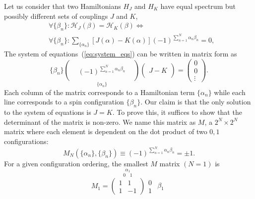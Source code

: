 \documentclass[a4paper]{article}
\newcommand{\Ha}[0]{\mathcal{H}}
\begin{document}
Let us consider that two Hamiltonians $H_J$ and $H_K$ have equal spectrum but possibly different sets of couplings $J$ and $K$,
\begin{align}
	&\forall \{\beta_n\}: \Ha_J(\beta) = \Ha_K(\beta) \Leftrightarrow \\
	&\forall \{\beta_n\}: \sum_{\{\alpha_n\}} [J(\alpha) - K(\alpha)] (-1)^{\sum_{n=1}^{N} \alpha_n \beta_n} = 0,
	\label{eq:system_eqs}
\end{align}
The system of equations~(\ref{eq:system_eqs}) can be written in matrix form as
\begin{equation}
	\{\beta_n\}\left.
	\underset{\{\alpha_n\}}{
		\left(\begin{matrix}
			& & \\
			& (-1)^{\sum_{n=1}^{N} \alpha_n \beta_n} & \\
			& &
		\end{matrix}\right)
		}
		\right.
		\left(\begin{matrix}
		\\
		J - K \\
		\left.\right.
	\end{matrix}\right)
	=
	\left(\begin{matrix}
		0\\
		0\\
		\vdots
	\end{matrix}\right).
\end{equation}
Each column of the matrix corresponds to a Hamiltonian term $\{\alpha_n\}$ while each line corresponds to a spin configuration $\{\beta_n\}$. Our claim is that the only solution to the system of equations is $J = K$. To prove this, it suffices to show that the determinant of the matrix is non-zero. We name this matrix as $M$, a $2^N \times 2^N$ matrix where each element is dependent on the dot product of two $0,1$ configurations:
\begin{equation}
	M_N(\{\alpha_n\},\{\beta_n\}) \equiv (-1)^{\sum_{n=1}^{N} \alpha_n \beta_n} =\pm 1.
\end{equation}
For a given configuration ordering, the smallest $M$ matrix $(N=1)$ is
\begin{equation}
	M_1 =
	\overset{\alpha_1}{
	\overset{0~ ~ ~ ~1}{
	\left(\begin{matrix}
		1 & 1 \\
		1 & -1
	\end{matrix}\right)
	}}
	\begin{matrix}
		 0 \\
		 1
	\end{matrix}
	\begin{matrix}
		  \\
		 \beta_1\\
		 \left. \right.
	\end{matrix}
\end{equation}
\end{document}
